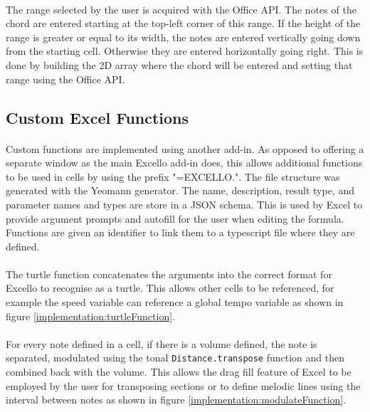 \paragraph{} The range selected by the user is acquired with the Office API. The notes of the chord are entered starting at the top-left corner of this range. If the height of the range is greater or equal to its width, the notes are entered vertically going down from the starting cell. Otherwise they are entered horizontally going right. This is done by building the 2D array where the chord will be entered and setting that range using the Office API.

\subsection{Custom Excel Functions}

\paragraph{} Custom functions are implemented using another add-in. As opposed to offering a separate window as the main Excello add-in does, this allows additional functions to be used in cells by using the prefix "=EXCELLO.". The file structure was generated with the Yeomann generator. The name, description, result type, and parameter names and types are store in a JSON schema. This is used by Excel to provide argument prompts and autofill for the user when editing the formula. Functions are given an identifier to link them to a typescript file where they are defined.

\paragraph{} The turtle function concatenates the arguments into the correct format for Excello to recognise as a turtle. This allows other cells to be referenced, for example the speed variable can reference a global tempo variable as shown in figure \ref{implementation:turtleFunction}.

\paragraph{} For every note defined in a cell, if there is a volume defined, the note is separated, modulated using the tonal \texttt{Distance.transpose} function and then combined back with the volume. This allows the drag fill feature of Excel to be employed by the user for transposing sections or to define melodic lines using the interval between notes as shown in figure \ref{implementation:modulateFunction}.

